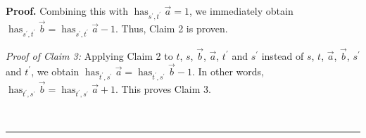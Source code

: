 \documentclass
[numbers=enddot,12pt,final,onecolumn,notitlepage,abstracton]{scrartcl}%
\theoremstyle{definition}
\newenvironment{proof}[1][Proof]{\noindent\textbf{#1.} }{\ \rule{0.5em}{0.5em}}
\begin{document}
\begin{proof}
Combining this with $\operatorname*{has}\nolimits_{s^{\prime},t^{\prime}%
}\overrightarrow{a}=1$, we immediately obtain $\operatorname*{has}%
\nolimits_{s^{\prime},t^{\prime}}\overrightarrow{b}=\operatorname*{has}%
\nolimits_{s^{\prime},t^{\prime}}\overrightarrow{a}-1$. Thus, Claim 2 is proven.

\textit{Proof of Claim 3:} Applying Claim 2 to $t$, $s$, $\overrightarrow{b}$,
$\overrightarrow{a}$, $t^{\prime}$ and $s^{\prime}$ instead of $s$, $t$,
$\overrightarrow{a}$, $\overrightarrow{b}$, $s^{\prime}$ and $t^{\prime}$, we
obtain $\operatorname*{has}\nolimits_{t^{\prime},s^{\prime}}\overrightarrow{a}%
=\operatorname*{has}\nolimits_{t^{\prime},s^{\prime}}\overrightarrow{b}-1$. In
other words, $\operatorname*{has}\nolimits_{t^{\prime},s^{\prime}%
}\overrightarrow{b}=\operatorname*{has}\nolimits_{t^{\prime},s^{\prime}%
}\overrightarrow{a}+1$. This proves Claim 3.


\end{proof}
\end{document}
